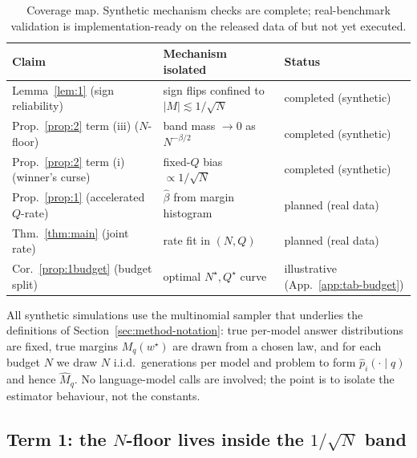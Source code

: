 \documentclass{article} %
\providecommand{\phat}{\widehat{p}}
\providecommand{\Mhat}{\widehat{M}}
\providecommand{\wstar}{w^{\star}}
\begin{document}
\begin{table}[t]
\centering
\small
\begin{tabular}{lll}
\toprule
Claim & Mechanism isolated & Status \\
\midrule
Lemma~\ref{lem:1} (sign reliability) & sign flips confined to $|M|\lesssim 1/\sqrt N$ & completed (synthetic) \\
Prop.~\ref{prop:2} term (iii) ($N$-floor) & band mass $\to 0$ as $N^{-\beta/2}$ & completed (synthetic) \\
Prop.~\ref{prop:2} term (i) (winner's curse) & fixed-$Q$ bias $\propto 1/\sqrt N$ & completed (synthetic) \\
Prop.~\ref{prop:1} (accelerated $Q$-rate) & $\hat\beta$ from margin histogram & planned (real data) \\
Thm.~\ref{thm:main} (joint rate) & rate fit in $(N,Q)$ & planned (real data) \\
Cor.~\ref{prop:1budget} (budget split) & optimal $N^\star,Q^\star$ curve & illustrative (App.~\ref{app:tab-budget}) \\
\bottomrule
\end{tabular}
\caption{Coverage map. Synthetic mechanism checks are complete; real-benchmark
validation is implementation-ready on the released data of
\citet{komiyama2026best} but not yet executed.}
\label{tab:coverage}
\end{table}

All synthetic simulations use the multinomial sampler that underlies the
definitions of Section~\ref{sec:method-notation}: true per-model answer distributions are
fixed, true margins $M_q(\wstar)$ are drawn from a chosen law, and for each budget
$N$ we draw $N$ i.i.d.\ generations per model and problem to form
$\phat_i(\cdot\mid q)$ and hence $\Mhat_q$. No language-model calls are involved;
the point is to isolate the estimator behaviour, not the constants.

\subsection{Term 1: the $N$-floor lives inside the $1/\sqrt N$ band}
\label{sec:exp-channel1}
\end{document}
